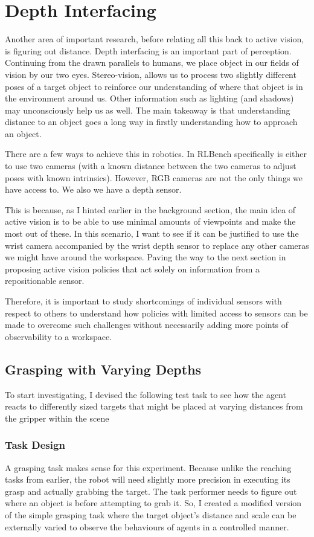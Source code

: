 \section{Depth Interfacing}
Another area of important research, before relating all this back to active vision, is figuring out distance. Depth interfacing is an important part of perception. Continuing from the drawn parallels to humans, we place object in our fields of vision by our two eyes. Stereo-vision, allows us to process two slightly different poses of a target object to reinforce our understanding of where that object is in the environment around us. Other information such as lighting (and shadows) may unconsciously help us as well. The main takeaway is that understanding distance to an object goes a long way in firstly understanding how to approach an object.

There are a few ways to achieve this in robotics. In RLBench specifically is either to use two cameras (with a known distance between the two cameras to adjust poses with known intrinsics). However, RGB cameras are not the only things we have access to. We also we have a depth sensor.

This is because, as I hinted earlier in the background section, the main idea of active vision is to be able to use minimal amounts of viewpoints and make the most out of these. In this scenario, I want to see if it can be justified to use the wrist camera accompanied by the wrist depth sensor to replace any other cameras we might have around the workspace. Paving the way to the next section in proposing active vision policies that act solely on information from a repositionable sensor.

Therefore, it is important to study shortcomings of individual sensors with respect to others to understand how policies with limited access to sensors can be made to overcome such challenges without necessarily adding more points of observability to a workspace.

\subsection{Grasping with Varying Depths}
To start investigating, I devised the following test task to see how the agent reacts to differently sized targets that might be placed at varying distances from the gripper within the scene

\subsubsection{Task Design}
A grasping task makes sense for this experiment. Because unlike the reaching tasks from earlier, the robot will need slightly more precision in executing its grasp and actually grabbing the target. The task performer needs to figure out where an object is before attempting to grab it. So, I created a modified version of the simple grasping task where the target object's distance and scale can be externally varied to observe the behaviours of agents in a controlled manner.


